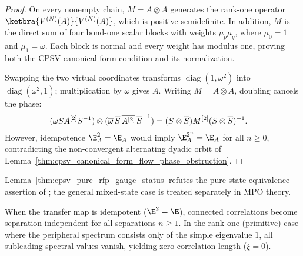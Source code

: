 \begin{proof}
    \leanok
    On every nonempty chain, $M=A\otimes\overline A$ generates the rank-one
    operator $\ketbra{V^{(N)}(A)}{V^{(N)}(A)}$, which is positive semidefinite.
    In addition, $M$ is the direct sum of four bond-one scalar blocks with weights
    $\mu_p\overline{\mu_q}$, where $\mu_0=1$ and $\mu_1=\omega$.
    Each block is normal and every weight has modulus one, proving both the CPSV
    canonical-form condition and its normalization.

    Swapping the two virtual coordinates transforms
    $\operatorname{diag}(1,\omega^2)$ into
    $\operatorname{diag}(\omega^2,1)$; multiplication by $\omega$ gives $A$.
    Writing $M=A\otimes\overline A$, doubling cancels the phase:
    \begin{align}
        (\omega S A^{[2]}S^{-1})\otimes
        (\overline\omega\,\overline S\,\overline{A^{[2]}}\,\overline S^{-1})
         & =(S\otimes\overline S)M^{[2]}(S\otimes\overline S)^{-1}.
        \notag
    \end{align}
    However, idempotence $\E_A^2=\E_A$ would imply $\E_A^{2^n}=\E_A$ for all
    $n\geq0$, contradicting the non-convergent alternating dyadic orbit of
    Lemma~\ref{thm:cpsv_canonical_form_flow_phase_obstruction}.
\end{proof}

\begin{remark}
    Lemma~\ref{thm:cpsv_pure_rfp_gauge_status} refutes the pure-state
    equivalence assertion of \cite[Appendix~D]{Cirac2016MPDO_arXiv}; the
    general mixed-state case is treated separately in MPO theory.
\end{remark}

\begin{remark}\label{rem:zero_correlation_length}
    When the transfer map is idempotent ($\E^2=\E$), connected correlations become
    separation-independent for all separations $n\ge 1$. In the rank-one
    (primitive) case where the peripheral spectrum consists only of the simple
    eigenvalue $1$, all subleading spectral values vanish, yielding zero
    correlation length ($\xi=0$).
\end{remark}


